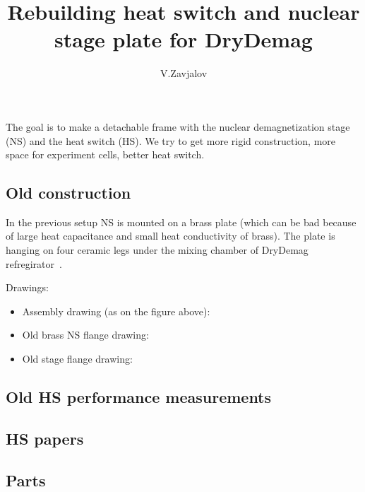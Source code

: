 \documentclass[a4paper]{article}
\title{Rebuilding heat switch and nuclear stage plate for DryDemag}
\author{V.Zavjalov}
\begin{document}
\maketitle

The goal is to make a detachable frame with the nuclear demagnetization
stage (NS) and the heat switch (HS). We try to get more rigid
construction, more space for experiment cells, better heat switch.

\subsection*{Old construction}

In the previous setup NS is mounted on a brass plate (which can be bad
because of large heat capacitance and small heat conductivity of brass).
The plate is hanging on four ceramic legs under the mixing chamber of
DryDemag refregirator~\cite{drydemag}.


Drawings:
\begin{itemize}
\item Assembly drawing (as on the figure above):\\

\item Old brass NS flange drawing:\\

\item Old stage flange drawing:\\

\end{itemize}




\subsection*{Old HS performance measurements}

\subsection*{HS papers}

\subsection*{Parts}
\end{document}
